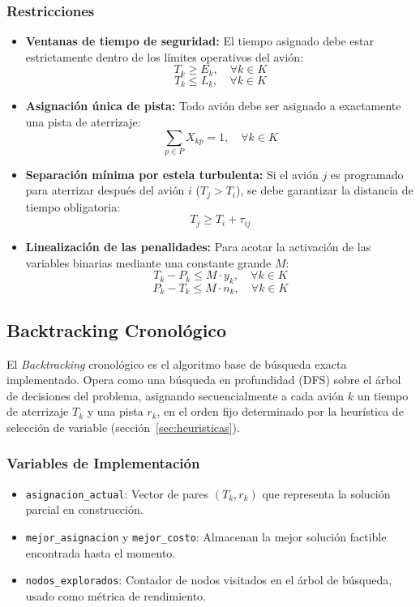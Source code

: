 \documentclass[12pt]{article}
\begin{document}
\subsubsection{Restricciones}
\begin{itemize}
    \item \textbf{Ventanas de tiempo de seguridad:} El tiempo asignado debe estar estrictamente dentro de los límites operativos del avión:
    $$ T_k \ge E_k, \quad \forall k \in K $$
    $$ T_k \le L_k, \quad \forall k \in K $$
    
    \item \textbf{Asignación única de pista:} Todo avión debe ser asignado a exactamente una pista de aterrizaje:
    $$ \sum_{p \in P} X_{kp} = 1, \quad \forall k \in K $$
    
    \item \textbf{Separación mínima por estela turbulenta:} Si el avión $j$ es programado para aterrizar después del avión $i$ ($T_j > T_i$), se debe garantizar la distancia de tiempo obligatoria:
    $$ T_j \ge T_i + \tau_{ij} $$
    
    \item \textbf{Linealización de las penalidades:} Para acotar la activación de las variables binarias mediante una constante grande $M$:
    $$ T_k - P_k \le M \cdot y_k, \quad \forall k \in K $$
    $$ P_k - T_k \le M \cdot n_k, \quad \forall k \in K $$
\end{itemize}

\subsection{Backtracking Cronológico}

El \textit{Backtracking} cronológico es el algoritmo base de búsqueda exacta implementado. Opera como una búsqueda en profundidad (DFS) sobre el árbol de decisiones del problema, asignando secuencialmente a cada avión $k$ un tiempo de aterrizaje $T_k$ y una pista $r_k$, en el orden fijo determinado por la heurística de selección de variable (sección~\ref{sec:heuristicas}).

\subsubsection{Variables de Implementación}
\begin{itemize}
    \item \texttt{asignacion\_actual}: Vector de pares $(T_k, r_k)$ que representa la solución parcial en construcción.
    \item \texttt{mejor\_asignacion} y \texttt{mejor\_costo}: Almacenan la mejor solución factible encontrada hasta el momento.
    \item \texttt{nodos\_explorados}: Contador de nodos visitados en el árbol de búsqueda, usado como métrica de rendimiento.
\end{itemize}
\end{document}
